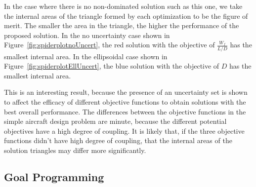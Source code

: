 In the case where there is no non-dominated solution such as this one,
we take the internal areas of the triangle formed by each optimization to be the figure of merit.
The smaller the area in the triangle, the higher the performance of the proposed solution.
In the no uncertainty case shown in Figure~\ref{fig:spiderplotnoUncert}, the red solution with the
objective of $\frac{W_f}{L/D}$ has the smallest internal area. In the ellipsoidal case shown in
Figure~\ref{fig:spiderplotEllUncert}, the blue solution with the objective of $D$ has the smallest internal area.

This is an interesting result, because the presence of an uncertainty set is
shown to affect the efficacy of different objective functions to obtain solutions
with the best overall performance. The differences between the objective functions
in the simple aircraft design problem are minute, because the different potential objectives
have a high degree of coupling. It is likely that, if the three objective functions didn't
have high degree of coupling, that the internal areas of the solution triangles may differ
more significantly.


\subsection{Goal Programming}

